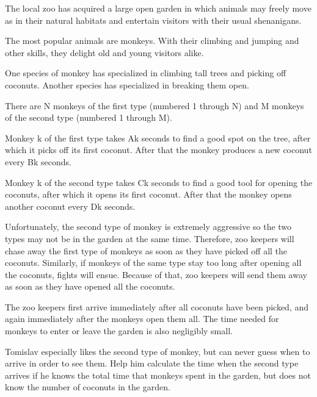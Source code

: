 The local zoo has acquired a large open garden in which animals may freely move as in their natural habitats and entertain visitors with their usual shenanigans.  

   The most popular animals are monkeys. With their climbing and jumping and other skills, they delight old and young visitors alike.  

   One species of monkey has specialized in climbing tall trees and picking off coconuts. Another species has specialized in breaking them open.  

   There are N monkeys of the first type (numbered 1 through N) and M monkeys of the second type (numbered 1 through M).  

   Monkey k of the first type takes Ak seconds to find a good spot on the tree, after which it picks off its first coconut. After that the monkey produces a new coconut every Bk seconds.  

   Monkey k of the second type takes Ck seconds to find a good tool for opening the coconuts, after which it opens its first coconut. After that the monkey opens another coconut every Dk seconds.  

   Unfortunately, the second type of monkey is extremely aggressive so the two types may not be in the garden at the same time. Therefore, zoo keepers will chase away the first type of monkeys as soon as they have picked off all the coconuts. Similarly, if monkeys of the same type stay too long after opening all the coconuts, fights will ensue. Because of that, zoo keepers will send them away as soon as they have opened all the coconuts.  

   The zoo keepers first arrive immediately after all coconuts have been picked, and again immediately after the monkeys open them all. The time needed for monkeys to enter or leave the garden is also negligibly small.  

   Tomislav especially likes the second type of monkey, but can never guess when to arrive in order to see them. Help him calculate the time when the second type arrives if he knows the total time that monkeys spent in the garden, but does not know the number of coconuts in the garden.  

\